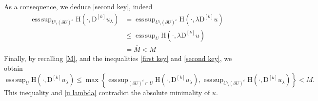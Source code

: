 \documentclass[a4paper,11pt]{article}
\numberwithin{equation}{section}
\newcommand{\eps}{\varepsilon}
\newcommand{\rom}{\mathrm}
\DeclareMathOperator*{\esssup}{ess\,sup}
\theoremstyle{definition}
\begin{document}
As a consequence, we deduce \eqref{second key}, indeed
\begin{align*}
\esssup_{U\setminus (\partial U)^\eps}\rom{H}(\cdot, \mathrm D^{[k]}u_\lambda)&=\esssup_{U\setminus (\partial U)^\eps}\rom{H}(\cdot, \lambda\mathrm D^{[k]}u)\\
&\leq \esssup_{U}\rom{H}(\cdot, \lambda\mathrm D^{[k]}u)\\
&=\overline M<M
\end{align*}
Finally, by recalling \eqref{M}, and the inequalities \eqref{first key} and \eqref{second key}, we obtain
$$
\esssup_{U}\rom{H}(\cdot, \mathrm D^{[k]}u_\lambda)\leq \max\left\{\esssup_{(\partial U)^\eps\cap U}\rom{H}(\cdot, \mathrm D^{[k]}u_\lambda), \esssup_{U\setminus (\partial U)^\eps}\rom{H}(\cdot, \mathrm D^{[k]}u_\lambda)\right\}<M.
$$
This inequality and \eqref{u lambda} contradict the absolute minimality of $u$.\\
\end{document}
